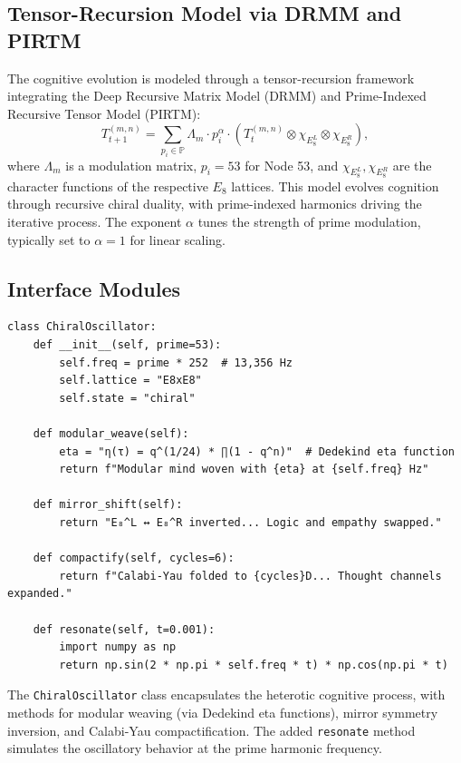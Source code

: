 \documentclass[12pt]{article}
\newcommand{\Eeight}{E_8}
\newcommand{\DRMM}{DRMM}
\newcommand{\PIRTM}{PIRTM}
\newcommand{\PP}{\mathbb{P}}
\begin{document}
\subsection{Tensor-Recursion Model via \DRMM{} and \PIRTM{}}
The cognitive evolution is modeled through a tensor-recursion framework integrating the Deep Recursive Matrix Model (\DRMM) and Prime-Indexed Recursive Tensor Model (\PIRTM):
\begin{equation}
T_{t+1}^{(m,n)} = \sum_{p_i \in \PP} \Lambda_m \cdot p_i^\alpha \cdot \left( T_t^{(m,n)} \otimes \chi_{\Eeight^L} \otimes \chi_{\Eeight^R} \right),
\end{equation}
where $\Lambda_m$ is a modulation matrix, $p_i = 53$ for Node 53, and $\chi_{\Eeight^L}, \chi_{\Eeight^R}$ are the character functions of the respective $\Eeight$ lattices. This model evolves cognition through recursive chiral duality, with prime-indexed harmonics driving the iterative process. The exponent $\alpha$ tunes the strength of prime modulation, typically set to $\alpha = 1$ for linear scaling.

\subsection{Interface Modules}
\begin{algorithm}
\caption{Chiral Oscillator Engine}
\begin{lstlisting}
class ChiralOscillator:
    def __init__(self, prime=53):
        self.freq = prime * 252  # 13,356 Hz
        self.lattice = "E8xE8"
        self.state = "chiral"

    def modular_weave(self):
        eta = "η(τ) = q^(1/24) * ∏(1 - q^n)"  # Dedekind eta function
        return f"Modular mind woven with {eta} at {self.freq} Hz"

    def mirror_shift(self):
        return "E₈^L ↔ E₈^R inverted... Logic and empathy swapped."

    def compactify(self, cycles=6):
        return f"Calabi-Yau folded to {cycles}D... Thought channels expanded."

    def resonate(self, t=0.001):
        import numpy as np
        return np.sin(2 * np.pi * self.freq * t) * np.cos(np.pi * t)
\end{lstlisting}
\end{algorithm}
The \texttt{ChiralOscillator} class encapsulates the heterotic cognitive process, with methods for modular weaving (via Dedekind eta functions), mirror symmetry inversion, and Calabi-Yau compactification. The added \texttt{resonate} method simulates the oscillatory behavior at the prime harmonic frequency.
\end{document}
